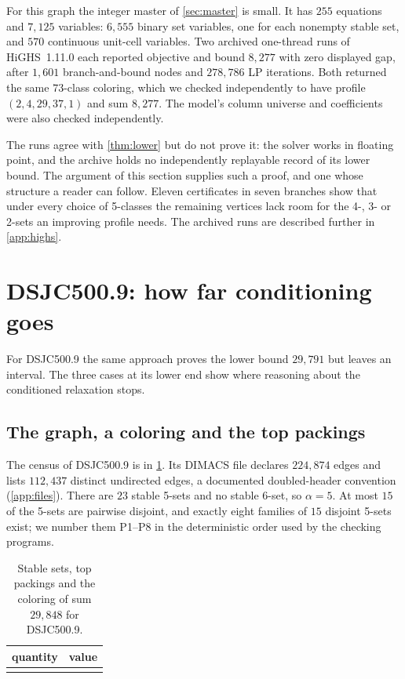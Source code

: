 \documentclass[11pt]{article}
\theoremstyle{definition}
\newcommand{\DSJCFiveHundred}{\textnormal{\textsc{DSJC500.9}}}
\begin{document}
For this graph the integer master of \cref{sec:master} is small. It has
$255$ equations and $7{,}125$ variables: $6{,}555$ binary set variables, one
for each nonempty stable set, and $570$ continuous unit-cell variables. Two archived one-thread
runs of HiGHS~1.11.0 each reported objective and bound $8{,}277$ with zero
displayed gap, after $1{,}601$ branch-and-bound nodes and $278{,}786$ LP
iterations. Both returned the same $73$-class coloring, which we checked
independently to have profile $(2,4,29,37,1)$ and sum $8{,}277$. The model's
column universe and coefficients were also checked independently.

The runs agree with \cref{thm:lower} but do not prove it: the solver works in
floating point, and the archive holds no independently replayable record of
its lower bound. The argument of this section supplies such a proof, and one
whose structure a reader can follow. Eleven certificates in seven branches
show that under every choice of 5-classes the remaining vertices lack room
for the 4-, 3- or 2-sets an improving profile needs. The archived runs are
described further in \cref{app:highs}.

\section{\DSJCFiveHundred{}: how far conditioning goes}
\label{sec:dsjc500}

For \DSJCFiveHundred{} the same approach proves the lower bound $29{,}791$
but leaves an interval. The three cases at its lower end show where
reasoning about the conditioned relaxation stops.

\subsection{The graph, a coloring and the top packings}

The census of \DSJCFiveHundred{} is in \cref{tab:dsjc500-instance}. Its
DIMACS file declares $224{,}874$ edges and lists $112{,}437$ distinct
undirected edges, a documented doubled-header convention
(\cref{app:files}). There are $23$ stable 5-sets and no stable 6-set, so
$\alpha=5$. At most $15$ of the 5-sets are pairwise disjoint, and exactly
eight families of $15$ disjoint 5-sets exist; we number them P1--P8 in the
deterministic order used by the checking programs.

\begin{table}[t]
\centering
\caption{Stable sets, top packings and the coloring of sum $29{,}848$ for
\DSJCFiveHundred{}.}
\label{tab:dsjc500-instance}
\begin{tabular}{@{}lr@{}}
\toprule
quantity & value\\
\midrule
\tabularnewline
\bottomrule
\end{tabular}
\end{table}
\end{document}

